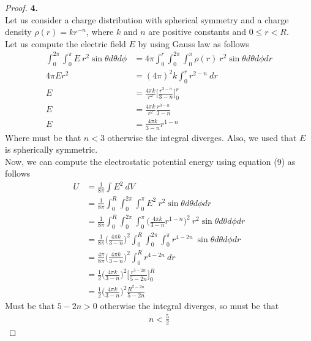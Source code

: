 \documentclass[11pt]{article}
\theoremstyle{definition}
\begin{document}
\cleardoublepage
\begin{proof}{\textbf{4.}}\\
Let us consider a charge distribution with spherical symmetry and a charge
density $\rho(r) = kr^{-n}$, where $k$ and $n$ are positive constants and
$0 \leq r < R$.
\\
Let us compute the electric field $E$ by using Gauss law as follows
\begin{align*}
    \int_0^{2\pi}\int_0^\pi E ~r^2 \sin\theta d\theta d\phi
    &= 4\pi \int_0^r \int_0^{2\pi}\int_0^\pi
    \rho(r)~r^2\sin\theta d\theta d\phi dr\\
    4\pi E r^2 &= (4\pi)^2 k \int_0^r r^{2-n}~ dr\\
    E &= \frac{4\pi k}{r^2} \bigg[\frac{r^{3-n}}{3-n}\bigg]_0^r\\
    E &= \frac{4\pi k}{r^2} \frac{r^{3-n}}{3-n}\\
    E &= \frac{4\pi k}{3 -n} r^{1-n}
\end{align*}
Where must be that $n < 3$ otherwise the integral diverges.
Also, we used that $E$ is spherically symmetric.
\\
Now, we can compute the electrostatic potential energy using equation (9)
as follows
\begin{align*}
    U &= \frac{1}{8\pi}\int E^2~dV\\
    &= \frac{1}{8\pi}\int_0^R \int_0^{2\pi}\int_0^\pi
    E^2~r^2\sin\theta d\theta d\phi dr\\
    &= \frac{1}{8\pi}\int_0^R \int_0^{2\pi}\int_0^\pi
    \bigg(\frac{4\pi k}{3 -n} r^{1-n}\bigg)^2~r^2\sin\theta d\theta d\phi dr\\
    &= \frac{1}{8\pi}\bigg(\frac{4\pi k}{3 - n}\bigg)^2
    \int_0^R \int_0^{2\pi}\int_0^\pi
    r^{4-2n}~\sin\theta d\theta d\phi dr\\
    &= \frac{4\pi}{8\pi}\bigg(\frac{4\pi k}{3 - n}\bigg)^2 \int_0^R
    r^{4-2n}~dr\\
    &= \frac{1}{2}\bigg(\frac{4\pi k}{3 - n}\bigg)^2 
    \bigg[\frac{r^{5-2n}}{5-2n}\bigg]_0^R\\
    &= \frac{1}{2}\bigg(\frac{4\pi k}{3 - n}\bigg)^2\frac{R^{5-2n}}{5-2n}
\end{align*}
Must be that $5 - 2n > 0$ otherwise the integral diverges, so must be that
\begin{align*}
    n < \frac{5}{2}
\end{align*}
\end{proof}
\end{document}

